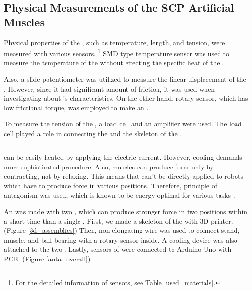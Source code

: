 \subsection{Physical Measurements of the SCP Artificial Muscles}
Physical properties of the \scpsnospace, such as temperature, length, and tension, were measured with various sensors.
\footnote{For the detailed information of sensors, see Table \ref{used_materials}.}
SMD type temperature sensor was used to measure the temperature of the \scps without effecting the specific heat of the \scpnospace.

Also, a slide potentiometer was utilized to measure the linear displacement of the \scpsnospace. However, since it had significant amount of friction, it was used when investigating about \scpnospace's characteristics. On the other hand, rotary sensor, which has low frictional torque, was employed to make an \antanospace. 

To measure the tension of the \scpsnospace, a load cell and an amplifier were used.
The load cell played a role in connecting the \scps and the skeleton of the \antanospace.

\subsection{\ANTA}
\scps can be easily heated by applying the electric current. However, cooling demands more sophisticated procedure. Also, muscles can produce force only by contracting, not by relaxing. This means that \scps can't be directly applied to robots which have to produce force in various positions.
Therefore, principle of antagonism was used, which is known to be energy-optimal for various tasks \cite{antagonism}.

An \anta was made with two \scpsnospace, which can produce stronger force in two positions within a short time than a single \scpnospace.
First, we made a skeleton of the \anta with 3D printer. (Figure \ref{3d_assemblies}) Then, non-elongating wire was used to connect stand, muscle, and ball bearing with a rotary sensor inside. A cooling device was also attached to the two \scpsnospace. Lastly, sensors of \anta were connected to Arduino Uno with PCB. (Figure \ref{anta_overall})

